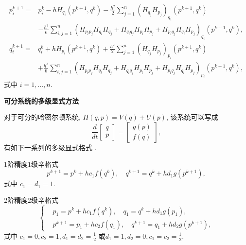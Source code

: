 \begin{equation*}
\begin{aligned}
	p_i^{k+1}= &p_i^{k}-hH_{q_i}(p^{k+1},q^{k})-\frac{h^2}{2}\sum_{j=1}^n(H_{q_j}H_{p_j})_{q_i}(p^{k+1},q^{k})\\
	&-\frac{h^3}{6}\sum_{i,j=1}^n(H_{p_lp_j}H_{q_l}H_{q_j}+H_{q_lq_j}H_{p_l}H_{p_j}+H_{p_lq_j}H_{q_l}H_{p_j})_{q_i}(p^{k+1},q^{k}),
\end{aligned}
\end{equation*}
\begin{equation*}
\begin{aligned}
	q_i^{k+1}= &q_i^{k}+hH_{p_i}(p^{k+1},q^{k})+\frac{h^2}{2}\sum_{j=1}^n(H_{q_j}H_{p_j})_{p_i}(p^{k+1},q^{k})\\
	&+\frac{h^3}{6}\sum_{i,j=1}^n(H_{p_lp_j}H_{q_l}H_{q_j}+H_{q_lq_j}H_{p_l}H_{p_j}+H_{p_lq_j}H_{q_l}H_{p_j})_{p_i}(p^{k+1},q^{k}),
\end{aligned}
\end{equation*}
式中 $i=1,\ldots,n$.

\noindent \textbf{可分系统的多级显式方法}

对于可分的哈密尔顿系统, $H(q,p)=V(q)+U(p)$, 该系统可以写成
\begin{equation*}
	\frac{d}{dt}\begin{bmatrix}
	q\\
	p
	\end{bmatrix}=\begin{bmatrix}
	g(p)\\
	f(q)
	\end{bmatrix},
\end{equation*}
有如下一系列的多级显式格式 \cite{qin2011struc}.

$1$阶精度$1$级辛格式
\begin{equation*}
	p^{k+1}=p^{k}+hc_1f(q^{k}),\quad q^{k+1}=q^{k}+hd_1g(p^{k+1}),
\end{equation*}
式中 $c_1=d_1=1$.

$2$阶精度$2$级辛格式
\begin{equation*}
	\left\lbrace \begin{aligned}
		&p_1=p^{k}+hc_1f(q^{k}),\quad q_1=q^{k}+hd_1g(p_1),\\
		&p^{k+1}=p_1+hc_2f(q_1),\quad q^{k+1}=q_1+hd_2g(p^{k+1}),
	\end{aligned}\right.
\end{equation*}
式中 $c_1=0,c_2=1,d_1=d_2=\frac{1}{2}$ 或$d_1=1,d_2=0,c_1=c_2=\frac{1}{2}$.

